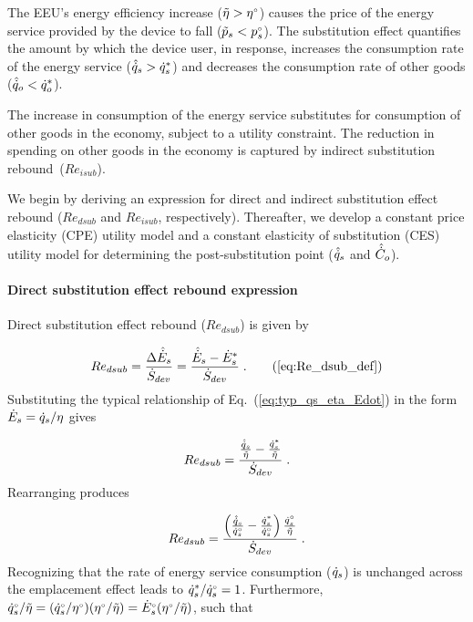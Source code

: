 The EEU's energy efficiency increase
($\tilde{\eta} > {}{\eta}^{\scriptscriptstyle \circ}$)
causes the price of the energy service provided by the device to fall
($\tilde{p}_s < {}{p}^{\scriptscriptstyle \circ}_s$).
The substitution effect quantifies the amount by which
the device user, in response,
increases the consumption rate of the energy service ($\hat{\dot{q}}_s > {\dot{q}}^*_s$) and
decreases the consumption rate of other goods ($\hat{\dot{q}}_o < {\dot{q}}^*_o$).

The increase in consumption of the energy service 
substitutes for consumption of other goods in the economy,
subject to a utility constraint.
The reduction in spending on other goods in the economy
is captured by indirect substitution rebound~($Re_{isub}$).

We begin by deriving an expression for direct and indirect 
substitution effect rebound ($Re_{dsub}$ and $Re_{isub}$, respectively).
Thereafter, we develop 
a constant price elasticity (CPE) utility model and
a constant elasticity of substitution (CES) utility model
for determining the 
post-substitution point ($\hat{\dot{q}}_s$ and $\hat{\dot{C}}_o$).


\paragraph{Direct substitution effect rebound expression}
\label{sec:Redsub_expression}

Direct substitution effect rebound ($Re_{dsub}$) is given by

\begin{equation}
  Re_{dsub} = \frac{\Delta \rasub{E}_s}{\Sdot} = \frac{\rasub{E}_s - \rbsub{E}_s}{\Sdot} \; . \tag{\ref{eq:Re_dsub_def}}
\end{equation}
%
Substituting the typical relationship of Eq.~(\ref{eq:typ_qs_eta_Edot})
in the form $\dot{E}_s = \dot{q}_s/\eta$ gives

\begin{equation}
  Re_{dsub} = \frac{\frac{\hat{\dot{q}}_s}{\tilde{\eta}} - \frac{{\dot{q}}^*_s}{\tilde{\eta}}}{\dot{S}_{dev}} \; .
\end{equation}
%
Rearranging produces

\begin{equation}
  Re_{dsub} = \frac{ \left( \frac{\hat{\dot{q}}_s}{{}{\dot{q}}^{\scriptscriptstyle \circ}_s}
                    - \frac{{\dot{q}}^*_s}{{}{\dot{q}}^{\scriptscriptstyle \circ}_s}  \right) \frac{{}{\dot{q}}^{\scriptscriptstyle \circ}_s}{\tilde{\eta}} }{\dot{S}_{dev}} \; .
\end{equation}
%
Recognizing that the rate of energy service consumption ($\dot{q}_s$)
is unchanged across the emplacement effect leads to ${\dot{q}}^*_s/{}{\dot{q}}^{\scriptscriptstyle \circ}_s = 1$.
Furthermore, ${}{\dot{q}}^{\scriptscriptstyle \circ}_s/\tilde{\eta}
            = ({}{\dot{q}}^{\scriptscriptstyle \circ}_s/{}{\eta}^{\scriptscriptstyle \circ}) ({}{\eta}^{\scriptscriptstyle \circ}/\tilde{\eta})
            = {}{\dot{E}}^{\scriptscriptstyle \circ}_s ({}{\eta}^{\scriptscriptstyle \circ}/\tilde{\eta})$,
such that

